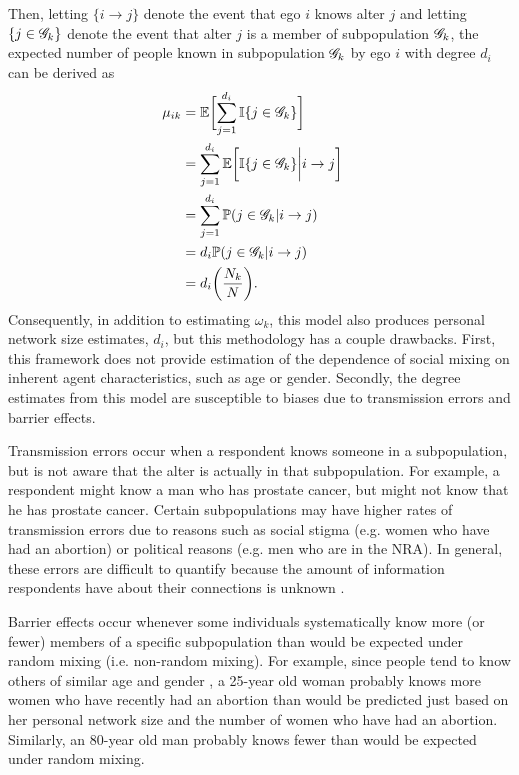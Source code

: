 Then, letting $\{i \to j\}$ denote the event that ego $i$ knows alter $j$ and letting $\{j \in \mathcal{G}_k\}$ denote the event that alter $j$ is a member of subpopulation $\mathcal{G}_k$, the expected number of people known in subpopulation $\mathcal{G}_k$ by ego $i$ with degree $d_i$ can be derived as
\begin{align}
\mu_{ik} 
&= \mathbb{E} \biggl[ \sum_{j=1}^{d_i} \mathbb{I}\{ j \in \mathcal{G}_k \} \biggr] && \\\nonumber
&= \sum_{j=1}^{d_i} \mathbb{E} \biggl[ \mathbb{I}\{ j \in \mathcal{G}_k \} \biggl| i \to j \biggr] && \\\nonumber
&= \sum_{j=1}^{d_i} \mathbb{P}( j \in \mathcal{G}_k | i \to j) && \\\nonumber
&= d_i \mathbb{P}( j \in \mathcal{G}_k | i \to j) && \\\nonumber
&= d_i \biggl( \frac{N_k}{N} \biggr).
\end{align}
Consequently, in addition to estimating $\omega_k$, this model also produces personal network size estimates, $d_i$, but this methodology has a couple drawbacks. First, this framework does not provide estimation of the dependence of social mixing on inherent agent characteristics, such as age or gender. Secondly, the degree estimates from this model are susceptible to biases due to transmission errors and barrier effects. 

Transmission errors occur when a respondent knows someone in a subpopulation, but is not aware that the alter is actually in that subpopulation. For example, a respondent might know a man who has prostate cancer, but might not know that he has prostate cancer. Certain subpopulations may have higher rates of transmission errors due to reasons such as social stigma (e.g. women who have had an abortion) or political reasons (e.g. men who are in the NRA). In general, these errors are difficult to quantify because the amount of information respondents have about their connections is unknown \citep{Killworth+others:2006}. 

Barrier effects occur whenever some individuals systematically know more (or fewer) members of a specific subpopulation than would be expected under random mixing (i.e. non-random mixing). For example, since people tend to know others of similar age and gender \citep{McPherson+others:2001}, a 25-year old woman probably knows more women who have recently had an abortion than would be predicted just based on her personal network size and the number of women who have had an abortion. Similarly, an 80-year old man probably knows fewer than would be expected under random mixing. 

